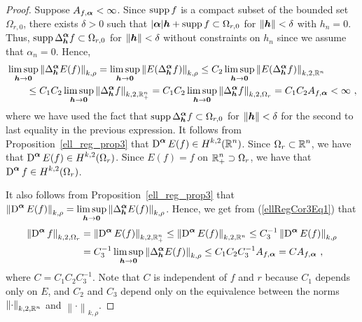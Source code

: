 \begin{proof}
 Suppose $A_{f,{\bm{\alpha}}} < \infty$.
Since $\operatorname{supp} f$ is a compact subset of the bounded set $\Omega_{r,0}$,
there exists $\delta >0$ such that
$|{\bm{\alpha}}| {\bm{h}} + \operatorname{supp} f \subset \Omega_{r,0}$
for $\|{\bm{h}}\| < \delta$ with $h_n = 0$.  Thus,
$\displaystyle \operatorname{supp} \Delta^{{\bm{\alpha}}}_{{\bm{h}}} f \subset \Omega_{r,0}$ for
$\|{\bm{h}}\| < \delta$ without constraints on $h_n$ since we assume
that $\alpha_n = 0$.  Hence,
\begin{align}
&\limsup_{{\bm{h}}\rightarrow {\bm{0}}}
  \left\| \Delta^{{\bm{\alpha}}}_{{\bm{h}}} E(f)\right \|_{k,\rho}
= \limsup_{{\bm{h}}\rightarrow {\bm{0}}}
  \left\| E(\Delta^{{\bm{\alpha}}}_{{\bm{h}}} f)\right \|_{k,\rho}
\leq C_2 \limsup_{{\bm{h}}\rightarrow {\bm{0}}}
\left\| E(\Delta^{{\bm{\alpha}}}_{{\bm{h}}} f)\right \|_{k,2,\mathbb{R}^n} \nonumber \\
&\qquad \leq C_1 C_2 \limsup_{{\bm{h}}\rightarrow {\bm{0}}}
\left\| \Delta^{{\bm{\alpha}}}_{{\bm{h}}} f\right \|_{k,2,\mathbb{R}^n_+}
= C_1 C_2 \limsup_{{\bm{h}}\rightarrow {\bm{0}}}
\left\| \Delta^{{\bm{\alpha}}}_{{\bm{h}}} f\right \|_{k,2,\Omega_r}
= C_1 C_2 A_{f,{\bm{\alpha}}} < \infty \ ,
\label{ellRegCor3Eq1}
\end{align}
where we have used the fact that
$\displaystyle \operatorname{supp} \Delta^{{\bm{\alpha}}}_{{\bm{h}}} f \subset \Omega_{r,0}$
for $\|{\bm{h}}\| < \delta$ for the second to last equality in the
previous expression.
It follows from Proposition~\ref{ell_reg_prop3} that 
$\displaystyle \operatorname{D}^{{\bm{\alpha}}} E(f) \in H^{k,2}(\mathbb{R}^n)$.
Since $\displaystyle \Omega_r \subset \mathbb{R}^n$, we have that
$\displaystyle \operatorname{D}^{{\bm{\alpha}}} E(f) \in H^{k,2}(\Omega_r)$.  Since
$E(f) = f$ on $\displaystyle \mathbb{R}^n_+ \supset \Omega_r$, we have that
$\displaystyle \operatorname{D}^{{\bm{\alpha}}} f \in H^{k,2}(\Omega_r)$.

 It also follows from Proposition~\ref{ell_reg_prop3}
that $\displaystyle \left\|\operatorname{D}^{{\bm{\alpha}}} E(f)\right\|_{k,\rho}
= \limsup_{{\bm{h}}\rightarrow {\bm{0}}}
\left\| \Delta^{{\bm{\alpha}}}_{{\bm{h}}} E(f)\right \|_{k,\rho}$.
Hence, we get from (\ref{ellRegCor3Eq1}) that
\begin{align*}
\left\|\operatorname{D}^{{\bm{\alpha}}} f\right\|_{k,2,\Omega_r}
&= \left\| \operatorname{D}^{{\bm{\alpha}}} E(f) \right\|_{k,2,\mathbb{R}^n_+}
\leq \left\|\operatorname{D}^{{\bm{\alpha}}} E(f)\right\|_{k,2,\mathbb{R}^n}
\leq C_3^{-1} \left\|\operatorname{D}^{{\bm{\alpha}}} E(f)\right\|_{k,\rho} \\
&= C_3^{-1} \limsup_{{\bm{h}}\rightarrow {\bm{0}}}
\left\| \Delta^{{\bm{\alpha}}}_{{\bm{h}}} E(f)\right \|_{k,\rho}
\leq C_1 C_2 C_3^{-1} A_{f,{\bm{\alpha}}}
= C A_{f,{\bm{\alpha}}} \ ,
\end{align*}
where $C= C_1 C_2 C_3^{-1}$.  Note that $C$ is independent of $f$ and $r$
because $C_1$ depends only on $E$, and $C_2$ and $C_3$ depend only on
the equivalence between the norms
$\displaystyle \left\|\cdot\right\|_{k,2,\mathbb{R}^n}$ and 
$\displaystyle \left\|\cdot\right\|_{k,\rho}$.
\end{proof}

